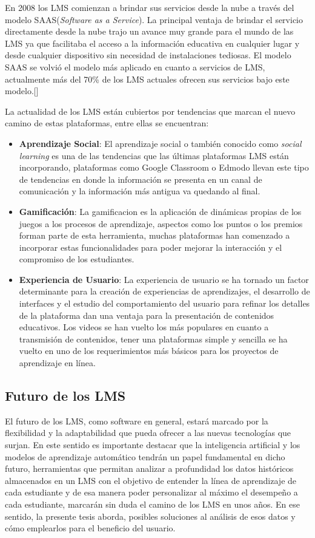 En 2008 los LMS comienzan a brindar sus servicios desde la nube a través del modelo SAAS(\textit{Software as a Service}). La principal ventaja de brindar el servicio directamente desde la nube trajo un avance muy grande para el mundo de las LMS ya que facilitaba el acceso a la información educativa en cualquier lugar y desde cualquier dispositivo sin necesidad de instalaciones tediosas. El modelo SAAS se volvió el modelo más aplicado en cuanto a servicios de LMS, actualmente más del 70\% de los LMS actuales ofrecen sus servicios bajo este modelo.[\cite{SaaS}]


La actualidad de los LMS están cubiertos por tendencias que marcan el nuevo camino de estas plataformas, entre ellas se encuentran:
\begin{itemize}
    \item \textbf{Aprendizaje Social}: El aprendizaje social o también conocido como \textit{social learning} es una de las tendencias que las últimas plataformas LMS están incorporando, plataformas como Google Classroom o Edmodo llevan este tipo de tendencias en donde la información se presenta en un canal de comunicación y la información más antigua va quedando al final.
    \item \textbf{Gamificación}: La gamificacion es la aplicación de dinámicas propias de los juegos a los procesos de aprendizaje, aspectos como los puntos o los premios forman parte de esta herramienta, muchas plataformas han comenzado a incorporar estas funcionalidades para poder mejorar la interacción y el compromiso de los estudiantes.
    \item \textbf{Experiencia de Usuario}: La experiencia de usuario se ha tornado un factor determinante para la creación de experiencias de aprendizajes, el desarrollo de interfaces y el estudio del comportamiento del usuario para refinar los detalles de la plataforma dan una ventaja para la presentación de contenidos educativos. Los videos se han vuelto los más populares en cuanto a transmisión de contenidos, tener una plataformas simple y sencilla se ha vuelto en uno de los requerimientos más básicos para los proyectos de aprendizaje en línea.
\end{itemize}

\subsection{Futuro de los LMS}

El futuro de los LMS, como software en general, estará marcado por la flexibilidad y la adaptabilidad que pueda ofrecer a las nuevas tecnologías que surjan. En este sentido es importante destacar que la inteligencia artificial y los modelos de aprendizaje automático tendrán un papel fundamental en dicho futuro, herramientas que permitan analizar a profundidad los datos históricos almacenados en un LMS con el objetivo de entender la línea de aprendizaje de cada estudiante y de esa manera poder personalizar al máximo el desempeño a cada estudiante, marcarán sin duda el camino de los LMS en unos años. En ese sentido, la presente tesis aborda, posibles soluciones al análisis de esos datos y cómo emplearlos para el beneficio del usuario.


